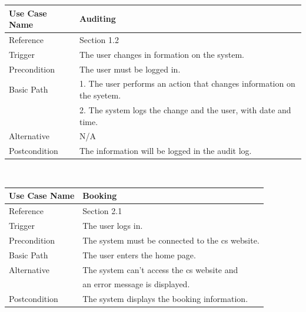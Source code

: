 \documentclass[10pt,a4paper]{article}
\begin{document}
                \begin{tabular}{|l|l|}\hline
                        Use Case Name   & Auditing \\\hline
                        Reference & Section 1.2\\\hline
                        Trigger & The user changes in formation on the system.\\\hline
                        Precondition & The user must be logged in.\\\hline
                        Basic Path & 1.	The user performs an action that changes information on the
                        syetem. \\\linebreak & 
                        2.	 The system logs the change and the user, with date and time.\\\hline
                        Alternative & N/A\\\hline
                        Postcondition & The information will be logged in the audit log.\\\hline
                \end{tabular} \\\linebreak           
                
                \begin{tabular}{|l|l|}\hline
                        Use Case Name   & Booking \\\hline
                        Reference & Section 2.1\\\hline
                        Trigger & The user logs in.\\\hline
                        Precondition & The system must be connected to the cs website.\\\hline
                        Basic Path & The user enters the home page.\\\hline
                        Alternative & The system can't access the cs website and  
                        \\\linebreak & an error message is displayed.\\\hline
                        Postcondition & The system displays the booking information.\\\hline
                \end{tabular} \\\linebreak
                
\end{document}
